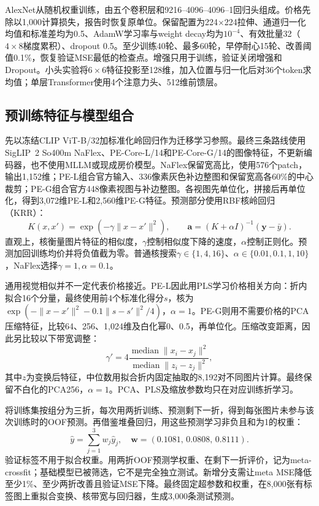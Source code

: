 \documentclass[conference,a4paper]{IEEEtran}
\begin{document}
AlexNet\cite{alexnet}从随机权重训练，由五个卷积层和9216--4096--4096--1回归头组成。价格先除以1,000计算损失，报告时恢复原单位。保留配置为224$\times$224拉伸、通道归一化均值和标准差均为0.5、AdamW学习率与weight decay均为$10^{-4}$、有效批量32（$4\times8$梯度累积）、dropout 0.5。至少训练40轮、最多60轮，早停耐心15轮、改善阈值0.1\%，恢复验证MSE最低的检查点。增强只用于训练，验证关闭增强和Dropout。小头实验将$6\times6$特征投影至128维，加入位置与归一化后对36个token求均值；单层Transformer使用4个注意力头、512维前馈层。

\subsection{预训练特征与模型组合}
先以冻结CLIP ViT-B/32\cite{clip}加标准化岭回归作为迁移学习参照。最终三条路线使用SigLIP~2 So400m NaFlex\cite{siglip2}、PE-Core-L/14和PE-Core-G/14\cite{pe}的图像特征，不更新编码器，也不使用MLLM或现成房价模型。NaFlex保留宽高比，使用576个patch，输出1,152维；PE-L组合官方输入、336像素灰色补边整图和保留宽高各60\%的中心裁剪；PE-G组合官方448像素视图与补边整图。各视图先单位化，拼接后再单位化，得到3,072维PE-L和2,560维PE-G特征。预测部分使用RBF核岭回归（KRR）\cite{krr}：
\begin{equation}
K(x,x')=\exp(-\gamma\|x-x'\|^2),\qquad
\boldsymbol a=(K+\alpha I)^{-1}(\boldsymbol y-\bar y).
\end{equation}
直观上，核衡量图片特征的相似度，$\gamma$控制相似度下降的速度，$\alpha$控制正则化。预测加回训练均价并将负值截为零。普通核搜索$\gamma\in\{1,4,16\}$、$\alpha\in\{0.01,0.1,1,10\}$，NaFlex选择$\gamma=1,\alpha=0.1$。

通用视觉相似并不一定代表价格接近。PE-L因此用PLS\cite{pls}学习价格相关方向：折内拟合16个分量，最终使用前4个标准化得分$s$，核为$\exp(-\|x-x'\|^2-0.1\|s-s'\|^2/4)$，$\alpha=1$。PE-G则用不需要价格的PCA\cite{pca}压缩特征，比较64、256、1,024维及白化幂0、0.5，再单位化。压缩改变距离，因此另比较以下带宽调整：
\begin{equation}
\gamma'=4\frac{\operatorname{median}\|x_i-x_j\|^2}
{\operatorname{median}\|z_i-z_j\|^2},
\end{equation}
其中$z$为变换后特征，中位数用拟合折内固定抽取的8,192对不同图片计算。最终保留不白化的PCA256，$\alpha=1$。PCA、PLS及缩放参数均只在对应训练折学习。

将训练集按组分为三折，每次用两折训练、预测剩下一折，得到每张图片未参与该次训练时的OOF预测。再借鉴堆叠回归\cite{stacking}，用这些预测学习非负且和为1的权重：
\begin{equation}
\hat y=\sum_{j=1}^{3}w_j\hat y_j,\quad
\boldsymbol w=(0.1081,\,0.0808,\,0.8111).
\end{equation}
验证标签不用于拟合权重。用两折OOF预测学权重、在剩下一折评价，记为meta-crossfit；基础模型已被筛选，它不是完全独立测试。新增分支需让meta MSE降低至少1\%、至少两折改善且验证MSE下降。最终固定超参数和权重，在8,000张有标签图上重拟合变换、核带宽与回归器，生成3,000条测试预测。
\end{document}
